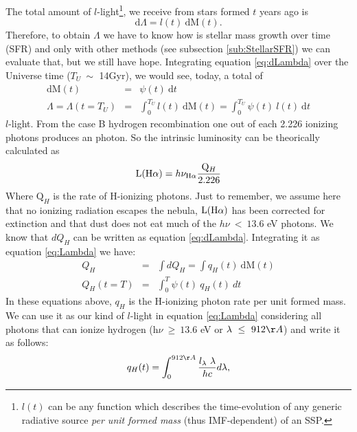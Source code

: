 \documentclass[a4paper,11pt]{article}
\begin{document}
The total amount of $l$-light\footnote{$l(t)$ can be any function which describes the time-evolution of any generic radiative source \emph{per unit formed mass} (thus IMF-dependent) of an SSP.}, we receive from stars formed $t$ years ago is
\begin{equation}
	\mathrm{d}\Lambda = l(t)\ \mathrm{d}\mathrm{M}(t).
	\label{eq:dLambda}
\end{equation}
\noindent Therefore, to obtain $\Lambda$ we have to know how is stellar mass growth over time (SFR) and only with other methods (see subsection \ref{sub:StellarSFR}) we can evaluate that, but we still have hope. Integrating equation \eqref{eq:dLambda} over the Universe time ($T_U\ \sim$ 14Gyr), we would see, today, a total of
\begin{eqnarray}
	\mathrm{d}\mathrm{M}(t) &=& \psi(t)\ \mathrm{d}t \\
	\Lambda = \Lambda(t = T_U) &=& \int_0^{T_U} l(t)\ \textrm{d}\textrm{M}(t) = \int_0^{T_U} \psi(t)\ l(t)\ \textrm{d}t
	\label{eq:Lambda}
\end{eqnarray}
\noindent $l$-light. 
From the case B hydrogen recombination one out of each 2.226 ionizing photons produces an \Halpha photon. So the intrinsic \Halpha luminosity can be theorically calculated as
\begin{equation}
	\mathrm{L}(\Halpha) = h \nu_{\Halpha} \frac{\mathrm{Q}_H}{2.226}
	\label{eq:LHa_recomb_theory}
\end{equation}
Where $\mathrm{Q}_H$ is the rate of H-ionizing photons. Just to remember, we assume here that no ionizing radiation escapes the nebula, $\mathrm{L}(\Halpha)$ has been corrected for extinction and that dust does not eat much of the $h\nu\ <\ 13.6$ eV photons. We know that $dQ_H$ can be written as equation \eqref{eq:dLambda}. Integrating it as equation \eqref{eq:Lambda} we have:
\begin{eqnarray}
	Q_H &=& \int dQ_H = \int q_H(t)\ \mathrm{d}\mathrm{M}(t) \\ 
	Q_H(t = T) &=& \int_0^T \psi(t)\ q_H(t)\ dt
	\label{eq:QH}
\end{eqnarray}
\noindent In these equations above, $q_H$ is the H-ionizing photon rate per unit formed mass. We can use it as our kind of $l$-light in equation \eqref{eq:Lambda} considering all photons that can ionize hydrogen (h$\nu\ \geq\ 13.6$ eV or $\lambda\ \leq\ 912\AA$) and write it as follows:
\begin{equation}
	q_H(t) = \int_0^{912\AA} \frac{l_\lambda\ \lambda}{h c} d\lambda,
	\label{eq:qH}
\end{equation}
\end{document}

